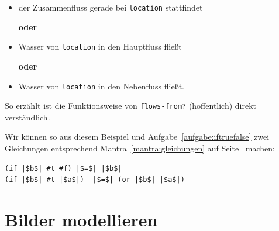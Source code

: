   \begin{itemize}
  \item der Zusammenfluss gerade bei \lstinline{location} stattfindet

    \centerline{\textbf{oder}}
  \item Wasser von \lstinline{location} in den Hauptfluss fließt

    \centerline{\textbf{oder}}
  \item Wasser von \lstinline{location} in den Nebenfluss fließt.
  \end{itemize}
%
So erzählt ist die Funktionsweise von \lstinline{flows-from?}
(hoffentlich) direkt verständlich.

Wir können so aus diesem Beispiel und
Aufgabe~\ref{aufgabe:iftruefalse} zwei Gleichungen entsprechend
Mantra~\ref{mantra:gleichungen} auf Seite~\pageref{mantra:gleichungen}
machen:
%
\begin{lstlisting}
(if |$b$| #t #f) |$=$| |$b$|
(if |$b$| #t |$a$|)  |$=$| (or |$b$| |$a$|)
\end{lstlisting}
%

\section{Bilder modellieren}
\label{sec:image-combinators}

